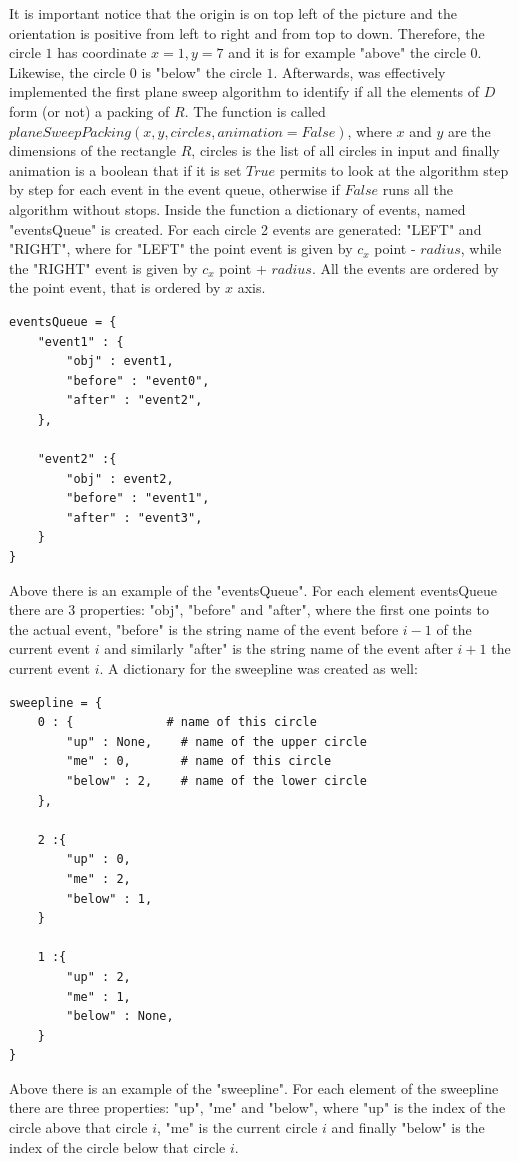 \documentclass[12pt]{article}
\begin{document}
\noindent It is important notice that the origin is on top left of the picture and the orientation is positive from left to right and from top to down. Therefore, the circle $1$ has coordinate $x=1, y=7$ and it is for example "above" the circle $0$. Likewise, the circle $0$ is "below" the circle $1$. Afterwards, was effectively implemented the first plane sweep algorithm to identify if all the elements of $D$ form (or not) a packing of $R$. The function is called $planeSweepPacking(x, y, circles, animation = False)$, where $x$ and $y$ are the dimensions of the rectangle $R$, circles is the list of all circles in input and finally animation is a boolean that if it is set $True$ permits to look at the algorithm step by step for each event in the event queue, otherwise if $False$ runs all the algorithm without stops. Inside the function a dictionary of events, named "eventsQueue" is created. For each circle 2 events are generated: "LEFT" and "RIGHT", where for "LEFT" the point event is given by $c_x$ point - $radius$, while the "RIGHT" event is given by $c_x$ point + $radius$. All the events are ordered by the point event, that is ordered by $x$ axis.  

\begin{lstlisting}
eventsQueue = {
	"event1" : {
		"obj" : event1,
		"before" : "event0",
		"after" : "event2",
	},
	
	"event2" :{
		"obj" : event2,
		"before" : "event1",
		"after" : "event3",
	}
}
\end{lstlisting}

\noindent Above there is an example of the "eventsQueue". For each element eventsQueue there are 3 properties: "obj", "before" and "after", where the first one points to the actual event, "before" is the string name of the event before $i-1$ of the current event $i$ and similarly "after" is the string name of the event after $i+1$ the current event $i$. A dictionary for the sweepline was created as well:

\begin{lstlisting}
sweepline = {
	0 : {             # name of this circle
		"up" : None,    # name of the upper circle
		"me" : 0,       # name of this circle
		"below" : 2,    # name of the lower circle
	},
	
	2 :{
		"up" : 0,
		"me" : 2,
		"below" : 1,
	}
	
	1 :{
		"up" : 2,
		"me" : 1,
		"below" : None,
	}
}
\end{lstlisting}
Above there is an example of the "sweepline". For each element of the sweepline there are three properties: "up", "me" and "below", where "up" is the index of the circle above that circle $i$, "me" is the current circle $i$ and finally "below" is the index of the circle below that circle $i$. \\
\end{document}
